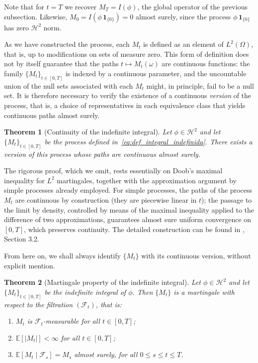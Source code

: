 \documentclass[11pt,a4paper,oneside]{report}
\theoremstyle{plain}
\newtheorem{teorema}{Theorem}[chapter]
\theoremstyle{definition}
\theoremstyle{remark}
\newcommand{\E}{\mathbb{E}}
\newcommand{\F}{\mathcal{F}}
\newcommand{\1}{\mathbf{1}}
\begin{document}
Note that for $t = T$ we recover $M_T = I(\phi)$, the global operator
of the previous subsection. Likewise,
$M_0 = I(\phi\, \mathbf{1}_{\{0\}}) = 0$ almost surely, since the
process $\phi\, \mathbf{1}_{\{0\}}$ has zero $\mathcal{H}^2$ norm.

As we have constructed the
process, each $M_t$ is defined as an element of $L^2(\Omega)$, that
is, up to modifications on sets of measure zero. This form of
definition does not by itself guarantee that the paths
$t \mapsto M_t(\omega)$ are continuous functions: the family
$\{M_t\}_{t \in [0, T]}$ is indexed by a continuous parameter, and
the uncountable union of the null sets associated with each $M_t$
might, in principle, fail to be a null set. It is therefore
necessary to verify the existence of a continuous \emph{version} of
the process, that is, a choice of representatives in each equivalence
class that yields continuous paths almost surely.

\begin{teorema}[Continuity of the indefinite integral]
\label{teo:continuidad_integral_indefinida}
Let $\phi \in \mathcal{H}^2$ and let $\{M_t\}_{t \in [0, T]}$ be the
process defined in~\eqref{eq:def_integral_indefinida}. There exists a
version of this process whose paths are continuous almost surely.
\end{teorema}

The rigorous proof, which we omit, rests essentially on Doob's
maximal inequality for $L^2$ martingales, together with the
approximation argument by simple processes already employed. For
simple processes, the paths of the process $M_t$ are continuous by
construction (they are piecewise linear in $t$); the passage to the
limit by density, controlled by means of the maximal inequality
applied to the difference of two approximations, guarantees almost
sure uniform convergence on $[0, T]$, which preserves continuity. The
detailed construction can be found in \cite{karatzas-shreve},
Section 3.2.

From here on, we shall always identify $\{M_t\}$ with its continuous
version, without explicit mention.

\begin{teorema}[Martingale property of the indefinite integral]
\label{teo:martingala_integral_indefinida}
Let $\phi \in \mathcal{H}^2$ and let $\{M_t\}_{t \in [0, T]}$ be the
indefinite integral of $\phi$. Then $\{M_t\}$ is a martingale with
respect to the filtration $(\F_t)$, that is:
\begin{enumerate}[label=\textnormal{(\roman*)}]
  \item $M_t$ is $\F_t$-measurable for all $t \in [0, T]$;
  \item $\E[|M_t|] < \infty$ for all $t \in [0, T]$;
  \item $\E[M_t \mid \F_s] = M_s$ almost surely, for all
        $0 \leq s \leq t \leq T$.
\end{enumerate}
\end{teorema}
\end{document}

